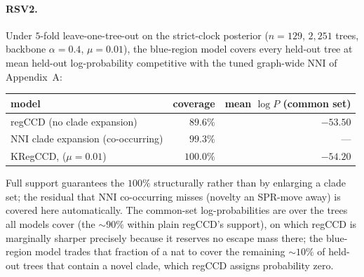 \documentclass{article}
\begin{document}
\paragraph{RSV2.}
Under $5$-fold leave-one-tree-out on the strict-clock posterior ($n=129$, $2{,}251$
trees, backbone $\alpha=0.4$, $\mu=0.01$), the blue-region model covers every
held-out tree at mean held-out log-probability competitive with the tuned
graph-wide NNI of Appendix~A:
\begin{center}
\renewcommand{\arraystretch}{1.1}
\begin{tabular}{lrr}
\hline
model & coverage & mean $\log P$ (common set) \\
\hline
regCCD (no clade expansion) & $89.6\%$ & $-53.50$ \\
NNI clade expansion (co-occurring) & $99.3\%$ & --- \\
KRegCCD, ($\mu=0.01$) & $\mathbf{100.0\%}$ & $-54.20$ \\
\hline
\end{tabular}
\end{center}
Full support guarantees the $100\%$ structurally rather than by enlarging a clade
set; the residual that NNI co-occurring misses (novelty an SPR-move away) is
covered here automatically. The common-set log-probabilities are over the trees
all models cover (the $\sim 90\%$ within plain regCCD's support), on which regCCD
is marginally sharper precisely because it reserves no escape mass there; the
blue-region model trades that fraction of a nat to cover the remaining $\sim 10\%$
of held-out trees that contain a novel clade, which regCCD assigns probability
zero.
\end{document}
